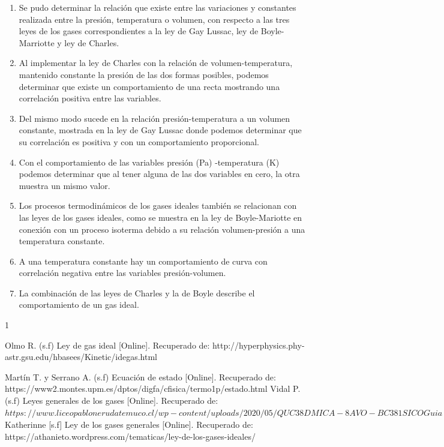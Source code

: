 \documentclass[journal,transmag]{IEEEtran}
\begin{document}
	\begin{enumerate}[label=(\roman*)]
		\item Se pudo determinar la relación que existe entre las variaciones y constantes realizada entre la presión, temperatura o volumen, con respecto a las tres leyes de los gases correspondientes a la ley de Gay Lussac, ley de Boyle-Marriotte y ley de Charles.  
		\item      Al implementar la ley de Charles con la relación de volumen-temperatura, mantenido constante la presión de las dos formas posibles, podemos determinar que existe un comportamiento de una recta mostrando una correlación positiva entre las variables.  
		\item      Del mismo modo sucede en la relación presión-temperatura a un volumen constante, mostrada en la ley de Gay Lussac donde podemos determinar que su correlación es positiva y con un comportamiento proporcional. 
		\item     Con el comportamiento de las variables presión (Pa) -temperatura (K) podemos determinar que al tener alguna de las dos variables en cero, la otra muestra un mismo valor.  
		\item     Los procesos termodinámicos de los gases ideales también se relacionan con las leyes de los gases ideales, como se muestra en la ley de Boyle-Mariotte en conexión con un proceso isoterma debido a su relación volumen-presión a una temperatura constante.  
		
		\item A una temperatura constante hay un comportamiento de curva con correlación negativa entre las variables presión-volumen.
		\item     La combinación de las leyes de Charles y la de Boyle describe el comportamiento de un gas ideal. 
	\end{enumerate}

\appendices


\ifCLASSOPTIONcaptionsoff
  \newpage
\fi


\begin{thebibliography}{1}


Olmo R. (s.f) Ley de gas ideal [Online]. Recuperado de: http://hyperphysics.phy-astr.gsu.edu/hbasees/Kinetic/idegas.html 

Martín T. y Serrano A. (s.f) Ecuación de estado [Online]. Recuperado de:  https://www2.montes.upm.es/dptos/digfa/cfisica/termo1p/estado.html 
Vidal P. (s.f) Leyes generales de los gases [Online]. Recuperado de:$ https://www.liceopablonerudatemuco.cl/wp-content/uploads/2020/05/QUC38DMICA-8AVO-BC381SICOGuia-leyes-de-Leyes_de_los_gases.pdf $
Katherinne [s.f] Ley de los gases generales [Online]. Recuperado de: https://athanieto.wordpress.com/tematicas/ley-de-los-gases-ideales/ 

\end{thebibliography}
\end{document}
